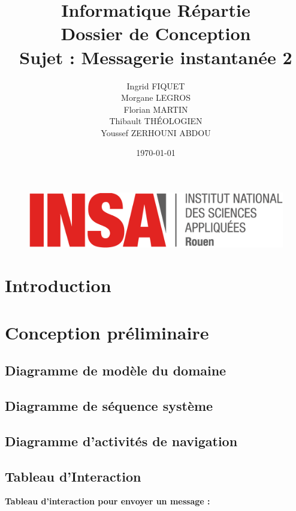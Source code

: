 \documentclass[a4paper,12pt]{article}
\title{Informatique Répartie\\Dossier de Conception\\Sujet : Messagerie instantanée 2}
\author{Ingrid FIQUET\\Morgane LEGROS\\Florian MARTIN\\Thibault THÉOLOGIEN\\Youssef ZERHOUNI ABDOU}
\date{\today}
\begin{document}
\begin{titlepage}
\vfill
	\begin{figure}
	\includegraphics[scale=0.3]{insarouen-logo.png}
	\end{figure}

\maketitle

\vfill
\noindent \hrulefill

\end{titlepage}



\newpage
\tableofcontents
\newpage

\section*{Introduction}
\newpage

\section{Conception préliminaire}

\subsection{Diagramme de modèle du domaine}

\subsection{Diagramme de séquence système}

\subsection{Diagramme d'activités de navigation}

\subsection{Tableau d’Interaction}

\textbf{Tableau d’interaction pour envoyer un message :} \\
\end{document}
